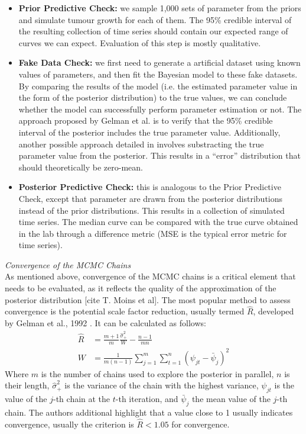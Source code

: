 \documentclass[11pt]{article}
\begin{document}
\begin{itemize}
    \item \textbf{Prior Predictive Check:} we sample 1,000 sets of parameter from the priors and simulate tumour growth for each of them. The 95\% credible interval of the resulting collection of time series should contain our expected range of curves we can expect. Evaluation of this step is mostly qualitative.
    \item \textbf{Fake Data Check:} we first need to generate a artificial dataset using known values of parameters, and then fit the Bayesian model to these fake datasets. By comparing the results of the model (i.e. the estimated parameter value in the form of the posterior distribution) to the true values, we can conclude whether the model can successfully perform parameter estimation or not. The approach proposed by Gelman et al. \cite{gelman2020bayesian} is to verify that the 95\% credible interval of the posterior includes the true parameter value. Additionally, another possible approach detailed in \cite{rosenbaum} involves substracting the true parameter value from the posterior. This results in a ``error'' distribution that should theoretically be zero-mean. 
    \item \textbf{Posterior Predictive Check:} this is analogous to the Prior Predictive Check, except that parameter are drawn from the posterior distributions instead of the prior distributions. This results in a collection of simulated time series. The median curve can be compared with the true curve obtained in the lab through a difference metric (MSE is the typical error metric for time series). 
\end{itemize}
\textit{Convergence of the MCMC Chains}\\[3pt]
As mentioned above, convergence of the MCMC chains is a critical element that needs to be evaluated, as it reflects the quality of the approximation of the posterior distribution [cite T. Moins et al]. The most popular method to assess convergence is the potential scale factor reduction, usually termed $\hat{R}$, developed by Gelman et al., 1992 \cite{rhat}. It can be calculated as follows:
\begin{align*}
    \hat{R} &= \frac{m+1}{m}\frac{\hat{\sigma}^2_+}{W}-\frac{n-1}{mn} \\ 
    W &= \frac{1}{m(n-1)}\sum^m_{j=1}\sum^n_{t=1}(\psi_{jt}-\bar{\psi}_j)^2 
\end{align*}
Where $m$ is the number of chains used to explore the posterior in parallel, $n$ is their length, $\hat{\sigma}^2_+$ is the variance of the chain with the highest variance, $\psi_{jt}$ is the value of the $j$-th chain at the $t$-th iteration, and $\bar{\psi}_j$ the mean value of the $j$-th chain. The authors additional highlight that a value close to 1 usually indicates convergence, usually the criterion is $\hat{R}<1.05$ for convergence.
\end{document}
